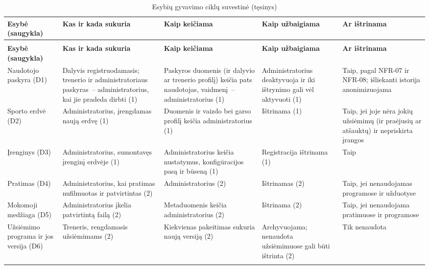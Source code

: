 \begingroup
\small
\setlength{\tabcolsep}{4pt}
\begin{longtable}{@{}>{\raggedright\arraybackslash}p{2.4cm}>{\raggedright\arraybackslash}p{3.2cm}>{\raggedright\arraybackslash}p{3.1cm}>{\raggedright\arraybackslash}p{3.2cm}>{\raggedright\arraybackslash}p{2.6cm}@{}}
\caption{Esybių gyvavimo ciklų suvestinė}\label{tab:gyvavimo-ciklai}\\
\toprule
\textbf{Esybė (saugykla)} & \textbf{Kas ir kada sukuria} & \textbf{Kaip keičiama} & \textbf{Kaip užbaigiama} & \textbf{Ar ištrinama} \\
\midrule
\endfirsthead
\caption[]{Esybių gyvavimo ciklų suvestinė (tęsinys)}\\
\toprule
\textbf{Esybė (saugykla)} & \textbf{Kas ir kada sukuria} & \textbf{Kaip keičiama} & \textbf{Kaip užbaigiama} & \textbf{Ar ištrinama} \\
\midrule
\endhead
Naudotojo paskyra (D1) & Dalyvis registruodamasis; trenerio ir administratoriaus paskyras~– administratorius, kai jie pradeda dirbti (1) & Paskyros duomenis (ir dalyvio ar trenerio profilį) keičia pats naudotojas, vaidmenį~– administratorius (1) & Administratorius deaktyvuoja ir iki ištrynimo gali vėl aktyvuoti (1) & Taip, pagal NFR-07 ir NFR-08; išliekanti istorija anonimizuojama \\ \addlinespace[3pt]
Sporto erdvė (D2) & Administratorius, įrengdamas naują erdvę (1) & Duomenis ir vaizdo bei garso profilį keičia administratorius (1) & Ištrinama (1) & Taip, jei joje nėra jokių užsiėmimų (ir praėjusių ar atšauktų) ir nepriskirta įrangos \\ \addlinespace[3pt]
Įrenginys (D3) & Administratorius, sumontavęs įrenginį erdvėje (1) & Administratorius keičia nustatymus, konfigūracijos pasą ir būseną (1) & Registracija ištrinama (1) & Taip \\ \addlinespace[3pt]
Pratimas (D4) & Administratorius, kai pratimas nufilmuotas ir patvirtintas (2) & Administratorius (2) & Ištrinamas (2) & Taip, jei nenaudojamas programose ir užduotyse \\ \addlinespace[3pt]
Mokomoji medžiaga (D5) & Administratorius įkelia patvirtintą failą (2) & Metaduomenis keičia administratorius (2) & Ištrinama (2) & Taip, jei nenaudojama pratimuose ir programose \\ \addlinespace[3pt]
Užsiėmimo programa ir jos versija (D6) & Treneris, rengdamasis užsiėmimams (2) & Kiekvienas pakeitimas sukuria naują versiją (2) & Archyvuojama; nenaudota užsiėmimuose gali būti ištrinta (2) & Tik nenaudota \\ \addlinespace[3pt]

\end{longtable}
